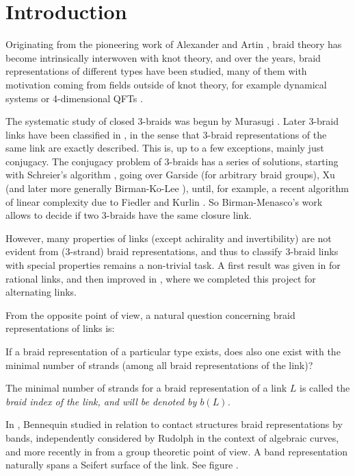 {\parskip0.2mm\tableofcontents}
\vspace{7mm}

\section{Introduction}

Originating from the pioneering work of Alexander
\cite{Alexander2} and Artin \cite{Artin,Artin2}, braid
theory has become intrinsically interwoven with knot theory,
and over the years, braid representations of different types
have been studied, many of them with motivation coming
from fields outside of knot theory, for example dynamical
systems \cite{Williams} or 4-dimensional QFTs \cite{Kreimer}.

The systematic study of closed 3-braids was begun by Murasugi
\cite{Murasugi2}. Later 3-braid links have been classified
in \cite{BirMen}, in the sense that 3-braid representations
of the same link are exactly described. This is, up to
a few exceptions, mainly just conjugacy. The conjugacy
problem of 3-braids has a series of solutions, starting with
Schreier's algorithm \cite{Sc}, going over Garside
\cite{Garside} (for arbitrary braid groups), Xu \cite{Xu}
(and later more generally Birman-Ko-Lee \cite{BKL}), until,
for example, a recent algorithm of linear complexity due to
Fiedler and Kurlin \cite{FK}. So Birman-Menasco's work allows
to decide if two 3-braids have the same closure link.

However, many properties of links (except achirality and
invertibility) are not evident from (3-strand) braid
representations, and thus to classify 3-braid links with
special properties remains a non-trivial task. A first result
was given in \cite{Murasugi} for rational links, and then
improved in \cite{3br}, where we completed this project for
alternating links.

{}From the opposite point of view, a natural question concerning
braid representations of links is: 

\begin{question}\label{q1}
If a braid representation of a particular type exists, does
also one exist with the minimal number of strands (among all
braid representations of the link)?
\end{question}

The minimal number of
strands for a braid representation of a link $L$ is called the
\em{braid index} of the link, and will be denoted by $b(L)$.

In \cite{Bennequin}, Bennequin studied in relation to contact
structures braid representations by bands, independently considered
by Rudolph \cite{Rudolph} in the context of algebraic curves, and
more recently in \cite{BKL} from a group theoretic point of view.
A band representation naturally spans a Seifert surface of the
link. See figure .
 
